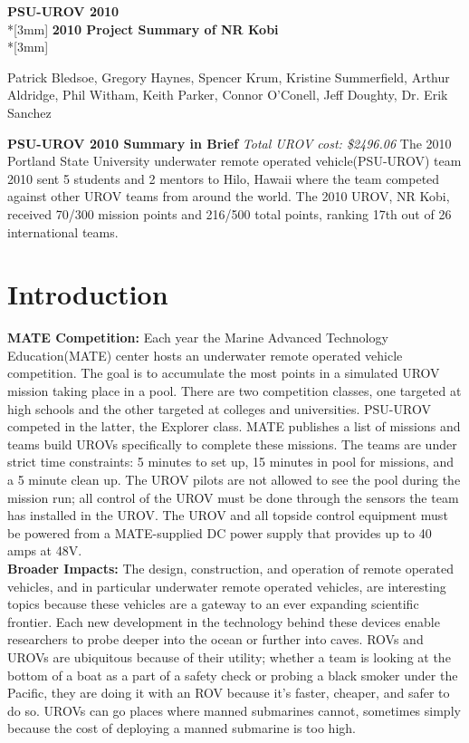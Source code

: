 \documentclass{article}
\begin{document}
\begin{center}
{\Large{\bf PSU-UROV 2010}}\\*[3mm]
{\bf 2010 Project Summary of NR Kobi} \\*[3mm]

Patrick Bledsoe, Gregory Haynes, Spencer Krum, Kristine Summerfield, Arthur Aldridge, Phil Witham, Keith Parker, Connor O'Conell, Jeff Doughty, Dr. Erik Sanchez

\end{center}

\noindent
{\bf PSU-UROV 2010 Summary in Brief}
{\it Total UROV cost: \$2496.06}
The 2010 Portland State University underwater remote operated vehicle(PSU-UROV) team 2010 sent 5 students and 2 mentors to Hilo, Hawaii where the team competed against other UROV teams from around the world. The 2010 UROV, NR Kobi, received 70/300 mission points and 216/500 total points, 
ranking 17th out of 26 international teams.


\section{Introduction}
\noindent
{\bf MATE Competition:}
Each year the Marine Advanced Technology Education(MATE) center hosts an underwater remote operated vehicle competition. The goal is to accumulate the most points
in a simulated UROV mission taking place in a pool. There are two competition classes, one targeted at high schools and 
the other targeted at colleges and universities. PSU-UROV competed in the latter, the Explorer class. MATE 
publishes a list of missions and teams build UROVs specifically to complete these missions. The teams are under strict
 time constraints: 5 minutes to set up, 15 minutes in pool for missions, and a 5 minute clean up. The UROV pilots are not allowed to see the pool during the mission run; all 
control of the UROV must be done through the sensors the team has installed in the UROV. The UROV and all topside control equipment must be 
powered from a MATE-supplied DC power supply that provides up to 40 amps at 48V.
\\

\noindent
{\bf Broader Impacts:}
The design, construction, and operation of remote operated vehicles, and in particular underwater remote operated vehicles, are interesting topics
because these vehicles are a gateway to an ever expanding scientific frontier. Each new development in the technology behind these devices enable 
researchers to probe deeper into the ocean or further into caves. ROVs and UROVs are ubiquitous because 
of their utility; whether a team is looking at the bottom of a boat as a part of a safety check or probing a black smoker under the Pacific, 
they are doing it with an ROV because it's faster, cheaper, and safer to do so. UROVs can go places where manned submarines cannot, sometimes 
simply because the cost of deploying a manned submarine is too high.  
\\
\end{document}

